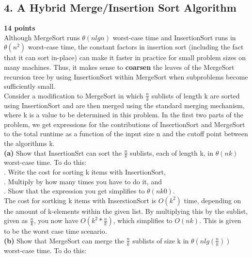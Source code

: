 \documentclass[12pt]{article}
\begin{document}
 \subsection*{4. A Hybrid Merge/Insertion Sort Algorithm}
 \linebreak
 \textbf{14 points} \\
 \linebreak
 Although MergeSort runs $\theta(n lg n)$ worst-case time and InsertionSort runs in $\theta(n^2)$ worst-case time, the constant factors in insertion sort (including the fact that it can sort in-place) can make it faster in practice for small problem sizes on many machines. Thus, it makes sense to \textbf{coarsen} the leaves of the MergeSort recursion tree by using InsertionSort within MergeSort when subproblems become sufficiently small. \\
 Consider a modification to MergeSort in which $\frac{n}{k}$ sublists of length k are sorted using InsertionSort and are then merged using the standard merging mechanism, where k is a value to be determined in this problem. In the first two parts of the problem, we get expressions for the contributions of InsertionSort and MergeSort to the total runtime as a function of the input size n and the cutoff point between the algorithms k. \\
 \linebreak
 \textbf{(a)} Show that InsertionSrt can sort the $\frac{n}{k}$ sublists, each of length k, in $\theta(nk)$ worst-case time. To do this: \\
 \linebreak
 . Write the cost for sorting k items with InsertionSort, \\
 . Multiply by how many times you have to do it, and \\
 . Show that the expression you get simplifies to $\theta(nk0)$.\\
 \linebreak
 The cost for sortking k items with InserstionSort is $O(k^2)$ time, depending on the amount of k-elements within the given list.   By multiplying this by the sublist, given as $\frac{n}{k}$, you now have $O(k^2*\frac{n}{k})$, which simplifies to $O(nk)$. This is given to be the worst case time scenario. \\ 
 \linebreak
 \textbf{(b)} Show that MergeSort can merge the $\frac{n}{k}$ sublists of size k in $\theta(n lg (\frac{n}{k}))$ worst-case time. To do this: \\
 \linebreak
\end{document}
